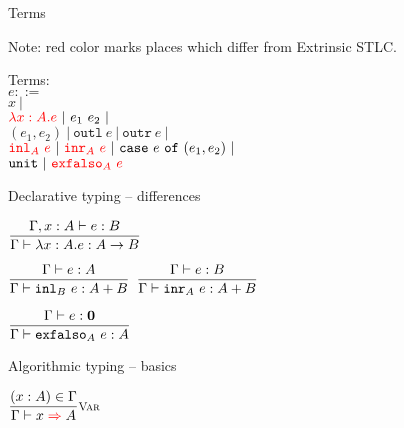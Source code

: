 \documentclass{beamer}
\newcommand{\pipe}{\ |\ }
\newcommand{\Fun}[2]{#1 \to #2}
\newcommand{\Sum}[2]{#1 + #2}
\newcommand{\Empty}{\textbf{0}}
\newcommand{\app}[2]{#1\ #2}
\newcommand{\pair}[2]{(#1, #2)}
\newcommand{\outl}[1][]{\texttt{outl}\ #1}
\newcommand{\outr}[1][]{\texttt{outr}\ #1}
\newcommand{\case}[3]{\texttt{case}\ #1\ \texttt{of}\ (#2, #3)}
\newcommand{\unit}{\texttt{unit}}
\newcommand{\fulltyping}[3]{#1 \vdash #2 : #3}
\newcommand{\typing}[2]{\fulltyping{\Gamma}{#1}{#2}}
\newcommand{\infrule}[3][]{\displaystyle \frac{#2}{#3} \textsc{\footnotesize{#1}}}
\newcommand{\extend}[3]{#1, #2 : #3}
\newcommand{\sidecond}[1]{#1}
\begin{document}
\begin{frame}{Terms}

Note: red color marks places which differ from Extrinsic STLC.

\vspace{2em}

Terms: \\
$e ::=$ \\
\qquad $x \pipe$ \\
\qquad $\termdiff{\ifun{x}{A}{e}} \pipe \app{e_1}{e_2} \pipe$ \\
\qquad $\pair{e_1}{e_2} \pipe \outl[e] \pipe \outr[e] \pipe$ \\
\qquad $\termdiff{\iinl{A}{e}} \pipe \termdiff{\iinr{A}{e}} \pipe \case{e}{e_1}{e_2} \pipe$ \\
\qquad $\unit \pipe \termdiff{\iexfalso{A}{e}}$

\vspace{2em}

\end{frame}

\begin{frame}{Declarative typing -- differences}

\begin{center}
  $\infrule{\fulltyping{\extend{\Gamma}{x}{A}}{e}{B}}{\typing{\ifun{x}{A}{e}}{\Fun{A}{B}}}$

  \vspace{2em}

  $\infrule{\typing{e}{A}}{\typing{\iinl{B}{e}}{\Sum{A}{B}}}$ \quad
  $\infrule{\typing{e}{B}}{\typing{\iinr{A}{e}}{\Sum{A}{B}}}$

  \vspace{2em}

  $\infrule{\typing{e}{\Empty}}{\typing{\iexfalso{A}{e}}{A}}$
\end{center}

\end{frame}

\begin{frame}{Algorithmic typing -- basics}

\begin{center}
  $\infrule[Var]{\sidecond{(x : A) \in \Gamma}}{\infer{x}{A}}$
\end{center}

\end{frame}
\end{document}
